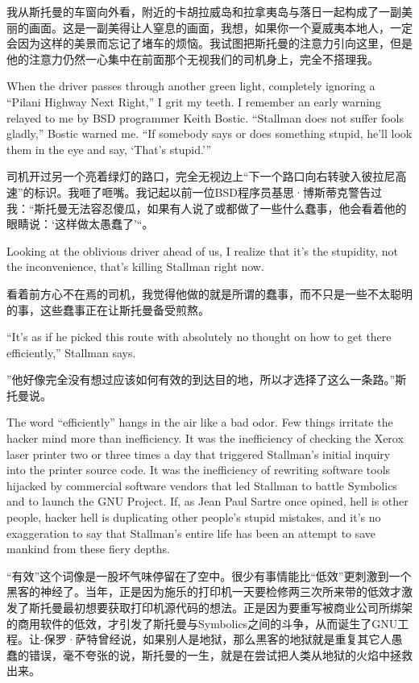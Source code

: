 \ifdefined\chs
我从斯托曼的车窗向外看，附近的卡胡拉威岛和拉拿夷岛与落日一起构成了一副美丽的画面。这是一副美得让人窒息的画面，我想，如果你一个夏威夷本地人，一定会因为这样的美景而忘记了堵车的烦恼。我试图把斯托曼的注意力引向这里，但是他的注意力仍然一心集中在前面那个无视我们的司机身上，完全不搭理我。
\fi

\ifdefined\eng
When the driver passes through another green light, completely ignoring a ``Pilani Highway Next Right,'' I grit my teeth. I remember an early warning relayed to me by BSD programmer Keith Bostic. ``Stallman does not suffer fools gladly,'' Bostic warned me. ``If somebody says or does something stupid, he'll look them in the eye and say, `That's stupid.'\hspace{0.01in}''
\fi

\ifdefined\chs
司机开过另一个亮着绿灯的路口，完全无视边上“下一个路口向右转驶入彼拉尼高速”的标识。我咂了咂嘴。我记起以前一位BSD程序员基思·博斯蒂克警告过我：“斯托曼无法容忍傻瓜，如果有人说了或都做了一些什么蠢事，他会看着他的眼睛说：‘这样做太愚蠢了’“。
\fi

\ifdefined\eng
Looking at the oblivious driver ahead of us, I realize that it's the stupidity, not the inconvenience, that's killing Stallman right now.
\fi

\ifdefined\chs
看着前方心不在焉的司机，我觉得他做的就是所谓的蠢事，而不只是一些不太聪明的事，这些蠢事正在让斯托曼备受煎熬。
\fi

\ifdefined\eng
``It's as if he picked this route with absolutely no thought on how to get there efficiently,'' Stallman says.
\fi

\ifdefined\chs
”他好像完全没有想过应该如何有效的到达目的地，所以才选择了这么一条路。”斯托曼说。
\fi

\ifdefined\eng
The word ``efficiently'' hangs in the air like a bad odor. Few things irritate the hacker mind more than inefficiency. It was the inefficiency of checking the Xerox laser printer two or three times a day that triggered Stallman's initial inquiry into the printer source code. It was the inefficiency of rewriting software tools hijacked by commercial software vendors that led Stallman to battle Symbolics and to launch the GNU Project. If, as Jean Paul Sartre once opined, hell is other people, hacker hell is duplicating other people's stupid mistakes, and it's no exaggeration to say that Stallman's entire life has been an attempt to save mankind from these fiery depths.
\fi

\ifdefined\chs
“有效”这个词像是一股坏气味停留在了空中。很少有事情能比“低效”更刺激到一个黑客的神经了。当年，正是因为施乐的打印机一天要检修两三次所来带的低效才激发了斯托曼最初想要获取打印机源代码的想法。正是因为要重写被商业公司所绑架的商用软件的低效，才引发了斯托曼与Symbolics之间的斗争，从而诞生了GNU工程。让-保罗·萨特曾经说，如果别人是地狱，那么黑客的地狱就是重复其它人愚蠢的错误，毫不夸张的说，斯托曼的一生，就是在尝试把人类从地狱的火焰中拯救出来。
\fi

